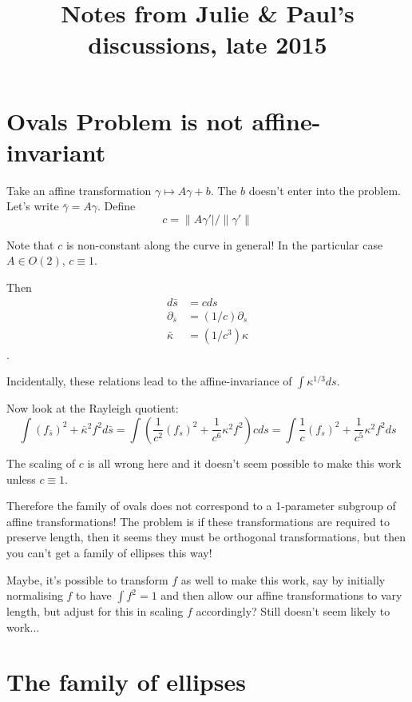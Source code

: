 \documentclass{amsart}
\begin{document}
\title{Notes from Julie \& Paul's discussions, late 2015}
\maketitle



\section*{Ovals Problem is not affine-invariant}

Take an affine transformation \(\gamma \mapsto A \gamma + b\). The \(b\) doesn't enter into the problem. Let's write \(\bar{\gamma} = A \gamma\). Define
\[
c = \|A\gamma'|/\|\gamma'\|
\]

Note that \(c\) is non-constant along the curve in general! In the particular case \(A \in O(2)\), \(c \equiv 1\).

Then 
\begin{align}
d\bar{s} &= c ds \\
\partial_{\bar{s}} &= (1/c) \partial_s \\ 
\bar{\kappa} &= (1/c^3) \kappa
\end{align}.

Incidentally, these relations lead to the affine-invariance of \(\int \kappa^{1/3} ds\).

Now look at the Rayleigh quotient:
\[
\int (f_{\bar{s}})^2 + \bar{\kappa}^2 f^2 d\bar{s} = \int \left(\frac{1}{c^2} (f_s)^2 + \frac{1}{c^6} \kappa^2 f^2\right) c ds = \int \frac{1}{c} (f_s)^2 + \frac{1}{c^5} \kappa^2 f^2 ds
\]

The scaling of \(c\) is all wrong here and it doesn't seem possible to make this work unless \(c \equiv 1\). 

Therefore the family of ovals does not correspond to a 1-parameter subgroup of affine transformations! The problem is if these transformations are required to preserve length, then it seems they must be orthogonal transformations, but then you can't get a family of ellipses this way!

Maybe, it's possible to transform \(f\) as well to make this work, say by initially normalising \(f\) to have \(\int f^2 = 1\) and then allow our affine transformations to vary length, but adjust for this in scaling \(f\) accordingly? Still doesn't seem likely to work...
\section*{The family of ellipses}
\end{document}
